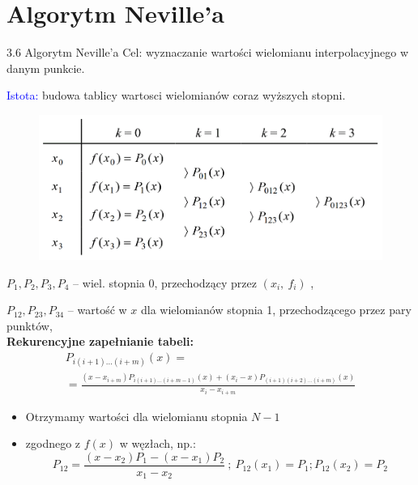 \section{Algorytm Neville'a}
\begin{frame}
{3.6 Algorytm Neville'a}
 Cel: wyznaczanie wartości wielomianu interpolacyjnego  w danym punkcie.

\textcolor{blue}{Istota:} budowa tablicy wartosci wielomianów coraz wyższych stopni.
\begin{figure}[h]
			\includegraphics[scale = 0.28]{img/3/interpol_3_6}
\label{Ilustracja metody Neville'a}	
\end{figure}
\end{frame}

\begin{frame}
$P_{1}, P_{2}, P_{3}, P_{4}$ -- wiel. stopnia $0$, przechodzący przez $(x_{i},\ f_{i})$ ,

$P_{12}, P_{23}, P_{34}$ -- wartość w $x$ dla wielomianów stopnia 1, przechodzącego przez pary punktów, \\
\vspace{4mm}
\textbf{Rekurencyjne zapełnianie tabeli:}
\begin{gather*}
	P_{i(i+1)\ldots(i+m)}(x)=\\
	=\displaystyle \frac{(x-x_{i+m})P_{i(i+1)\ldots(i+m-1)}(x)+(x_{i}-x)P_{(i+1)(i+2)\ldots(i+m)}(x)}{x_{i}-x_{i+m}}
\end{gather*}

\begin{itemize}
\item Otrzymamy wartości dla wielomianu stopnia $N-1$

\item zgodnego z $f(x)$ w węzłach, np.:
$$
P_{12}=\frac{(x-x_{2})P_{1}-(x-x_{1})P_{2}}{x_{1}-x_{2}}\ ;\ P_{12}(x_{1})=P_{1};P_{12}(x_{2})=P_{2}
$$

\end{itemize}

\end{frame}

